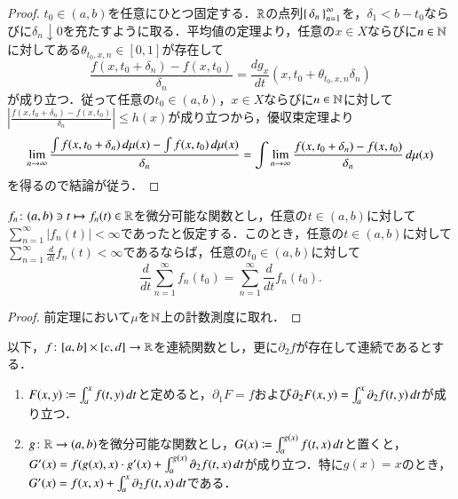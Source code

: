 \begin{proof}
$t_0\in(a,b)$を任意にひとつ固定する．$\mathbb{R}$の点列$\set{\delta_n}_{n=1}^\infty$を，$\delta_1 < b-t_0$ならびに$\delta_n \downarrow 0$を充たすように取る．平均値の定理より，任意の$x \in X$ならびに$n \in \mathbb{N}$に対してある$\theta_{t_0,x,n} \in [0,1]$が存在して
\begin{equation}
\frac{f(x,t_0+\delta_n) - f(x,t_0)}{\delta_n} = \frac{d g_x}{dt} (x,t_0+\theta_{t_0,x,n} \delta_n)
\end{equation}が成り立つ．従って任意の$t_0 \in (a,b)$，$x \in X$ならびに$n \in \mathbb{N}$に対して$\left|\frac{f(x,t_0+\delta_n) - f(x,t_0)}{\delta_n}\right| \leq h(x)$が成り立つから，優収束定理より
\begin{equation}
\lim_{n\to\infty}\frac{\int f(x,t_0+\delta_n) \mathop{}\!d \mu(x) - \int f(x,t_0) \mathop{}\!d \mu(x)}{\delta_n}= \int \lim_{n\to\infty}\frac{f(x,t_0+\delta_n) - f(x,t_0)}{\delta_n} \mathop{}\!d \mu(x)
\end{equation}を得るので結論が従う．
\end{proof}

\begin{cor}[項別微分]
$f_n \colon (a,b) \ni t \mapsto f_n(t) \in \mathbb{R}$を微分可能な関数とし，任意の$t \in (a,b)$に対して$\sum_{n=1}^\infty |f_n(t)| < \infty$であったと仮定する．このとき，任意の$t \in (a,b)$に対して
$\sum_{n=1}^\infty \frac{d}{dt} f_n(t) < \infty$であるならば，任意の$t_0 \in (a,b)$に対して
\begin{equation}
\frac{d}{dt} \sum_{n=1}^\infty f_n(t_0) = \sum_{n=1}^\infty \frac{d}{dt} f_n(t_0).
\end{equation}
\end{cor}

\begin{proof}
前定理において$\mu$を$\mathbb{N}$上の計数測度に取れ．
\end{proof}

\begin{prop}
以下，$f \colon [a,b] \times [c,d] \to \mathbb{R}$を連続関数とし，更に$\partial_2 f$が存在して連続であるとする．
\begin{enumerate}
\item $F(x,y) \coloneqq \int_a^x f(t,y) \mathop{}\!d t$と定めると，$\partial_1 F = f$および$\partial_2 F(x,y) = \int_a^x \partial_2 f(t,y) \mathop{}\!d t$が成り立つ．
\item $g \colon \mathbb{R} \to (a,b)$を微分可能な関数とし，$G(x) \coloneqq \int_a^{g(x)} f(t,x) \mathop{}\!d t$と置くと，$G'(x) = f(g(x), x)\cdot g'(x) + \int_a^{g(x)} \partial_2f(t,x) \mathop{}\!d t$が成り立つ．特に$g(x) = x$のとき，$G'(x) = f(x, x) + \int_a^x \partial_2f(t,x) \mathop{}\!d t$である．
\end{enumerate}
\end{prop}

